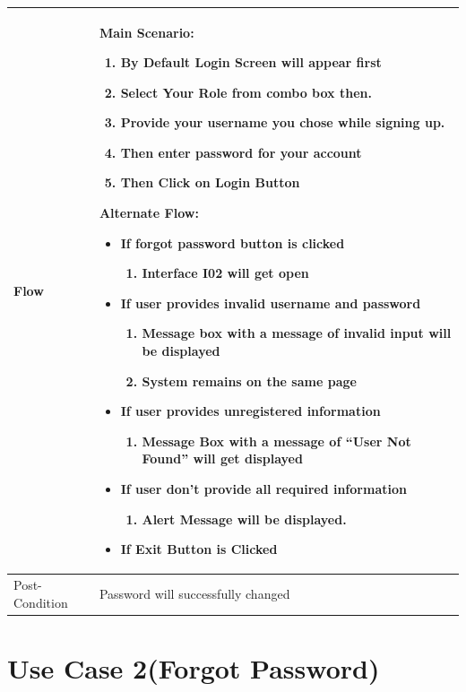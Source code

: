 \documentclass[12pt,a4paper]{report}
\begin{document}
\begin{tabular}{ | m{3cm} | m{12cm}| } 
\hline
Flow & Main Scenario:
\begin{enumerate}
\item   By Default Login Screen will appear first
\item	Select Your Role from combo box then.
\item	Provide your username you chose while signing up.
\item	Then enter password for your account
\item	Then Click on Login Button
\end{enumerate}
Alternate Flow:
\begin{itemize}
\item If forgot password button is clicked
	\begin{enumerate}
		\item Interface I02 will get open
	\end{enumerate}
\item If user provides invalid username and password
	\begin{enumerate}
	    \item	Message box with a message of invalid input will be displayed
		\item System remains on the same page
	\end{enumerate}
\item If user provides unregistered information
	\begin{enumerate}
		\item Message Box with a message of “User Not Found” will get displayed
	\end{enumerate}
\item If user don’t provide all required information
	\begin{enumerate}
		\item Alert Message will be displayed.
	\end{enumerate}
\item If Exit Button is Clicked  
\end{itemize}
\\ \hline
Post-Condition & Password will successfully changed  \\ \hline

\end{tabular}
\section{Use Case 2(Forgot Password)}
\end{document}
